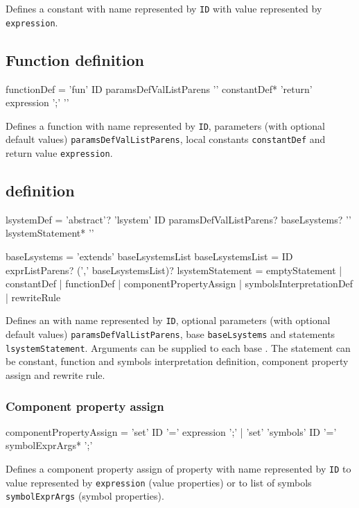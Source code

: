 Defines a constant with name represented by \texttt{ID} with value represented by \texttt{expression}.


\subsection{Function definition}
\begin{Grammar}
functionDef = 'fun' ID paramsDefValListParens
	'{' constantDef* 'return' expression ';' '}'
\end{Grammar}

Defines a function with name represented by \texttt{ID}, parameters (with optional default values) \texttt{paramsDefValListParens},
	local constants \texttt{constantDef} and return value \texttt{expression}.


\subsection{\lsystem definition}
\begin{Grammar}
lsystemDef = 'abstract'? 'lsystem' ID paramsDefValListParens?
	baseLsystems? '{' lsystemStatement* '}'

baseLsystems = 'extends' baseLsystemsList
baseLsystemsList = ID exprListParens? (',' baseLsystemsList)?
lsystemStatement = emptyStatement
	| constantDef
	| functionDef
	| componentPropertyAssign
	| symbolsInterpretationDef
	| rewriteRule
\end{Grammar}

Defines an \lsystem with name represented by \texttt{ID}, optional parameters (with optional default values) \texttt{paramsDefValListParens},
	base \lsystems \texttt{baseLsystems} and \lsystem statements \texttt{lsystemStatement}.
Arguments can be supplied to each base \lsystem.
The \lsystem statement can be constant, function and symbols interpretation definition, component property assign and rewrite rule.


\subsubsection{Component property assign}
\begin{Grammar}
componentPropertyAssign = 'set' ID '=' expression ';'
	| 'set' 'symbols' ID '=' symbolExprArgs* ';'
\end{Grammar}

Defines a component property assign of property with name represented by \texttt{ID} to value represented by \texttt{expression} (value properties)
	or to list of symbols \texttt{symbolExprArgs} (symbol properties). 


